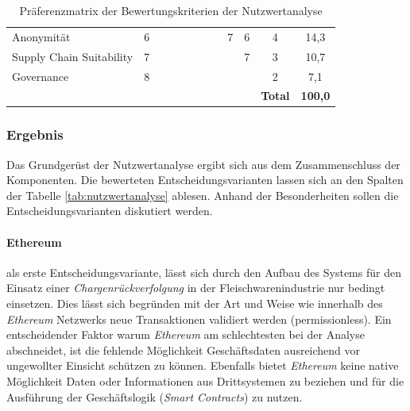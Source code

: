 \begin{table}[H]
{\begin{tabular}{@{}lccccccccccc@{}}
		Anonymität               & 6            & {\cellcolor{gray!25} } & {\cellcolor{gray!25} } & {\cellcolor{gray!25} } & {\cellcolor{gray!25} } & {\cellcolor{gray!25} } & {\cellcolor{gray!25} } & 7                       & 6                       & 4               & 14,3                \\ \addlinespace
		Supply Chain Suitability & 7            & {\cellcolor{gray!25} } & {\cellcolor{gray!25} }  & {\cellcolor{gray!25} } & {\cellcolor{gray!25} } & {\cellcolor{gray!25} } & {\cellcolor{gray!25} } & {\cellcolor{gray!25} } & 7                       & 3               & 10,7                \\ \addlinespace
		Governance               & 8            & {\cellcolor{gray!25} } & {\cellcolor{gray!25} }  & {\cellcolor{gray!25} } & {\cellcolor{gray!25} } & {\cellcolor{gray!25} } & {\cellcolor{gray!25} } & {\cellcolor{gray!25} } & {\cellcolor{gray!25} } & 2               & 7,1                 \\ \addlinespace
		\midrule
		&              &                         &                          &                         &                         &                         &                         &                         &                         & \textbf{Total}  & \textbf{100,0}      \\
		\bottomrule
	\end{tabular}%
	}
	\caption{Präferenzmatrix der Bewertungskriterien der Nutzwertanalyse}
	\label{tab:preferencematrix}
\end{table}

\subsubsection{Ergebnis}
Das Grundgerüst der Nutzwertanalyse ergibt sich aus dem Zusammenschluss der Komponenten. Die bewerteten Entscheidungsvarianten lassen sich an den Spalten der Tabelle \ref{tab:nutzwertanalyse} ablesen. Anhand der Besonderheiten sollen die Entscheidungsvarianten diskutiert werden.

\paragraph{Ethereum} als erste Entscheidungsvariante, lässt sich durch den Aufbau des Systems für den Einsatz einer \textit{Chargenrückverfolgung} in der Fleischwarenindustrie nur bedingt einsetzen. Dies lässt sich begründen mit der Art und Weise wie innerhalb des \textit{Ethereum} Netzwerks neue Transaktionen validiert werden (permissionless). Ein entscheidender Faktor warum \textit{Ethereum} am schlechtesten bei der Analyse abschneidet, ist die fehlende Möglichkeit Geschäftsdaten ausreichend vor ungewollter Einsicht schützen zu können. Ebenfalls bietet \textit{Ethereum} keine native Möglichkeit Daten oder Informationen aus Drittsystemen zu beziehen und für die Ausführung der Geschäftslogik (\textit{Smart Contracts}) zu nutzen.

